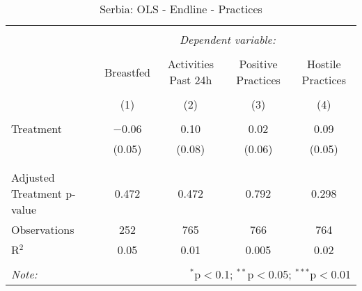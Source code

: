 
\begin{table}[!htbp] \centering 
  \caption{Serbia: OLS - Endline - Practices} 
  \label{tbl:Serbia: OLS - Endline - Practices} 
\begin{tabular}{@{\extracolsep{5pt}}lcccc} 
\\[-1.8ex]\hline 
\hline \\[-1.8ex] 
 & \multicolumn{4}{c}{\textit{Dependent variable:}} \\ 
\cline{2-5} 
\\[-1.8ex] & Breastfed & Activities Past 24h & Positive Practices & Hostile Practices \\ 
\\[-1.8ex] & (1) & (2) & (3) & (4)\\ 
\hline \\[-1.8ex] 
 Treatment & $-$0.06 & 0.10 & 0.02 & 0.09 \\ 
  & (0.05) & (0.08) & (0.06) & (0.05) \\ 
  & & & & \\ 
\hline \\[-1.8ex] 
Adjusted Treatment p-value & 0.472 & 0.472 & 0.792 & 0.298 \\ 
Observations & 252 & 765 & 766 & 764 \\ 
R$^{2}$ & 0.05 & 0.01 & 0.005 & 0.02 \\ 
\hline 
\hline \\[-1.8ex] 
\textit{Note:}  & \multicolumn{4}{r}{$^{*}$p$<$0.1; $^{**}$p$<$0.05; $^{***}$p$<$0.01} \\ 
\end{tabular} 
\end{table} 
